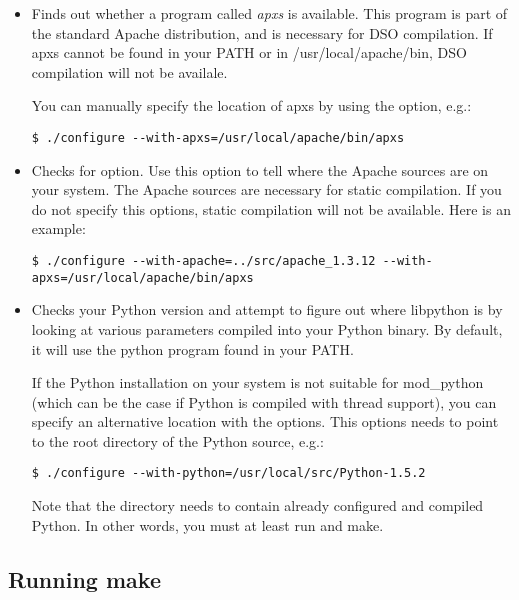 \begin{itemize}

\item
Finds out whether a program called \emph{apxs} is available. This
program is part of the standard Apache distribution, and is necessary
for DSO compilation. If apxs cannot be found in your PATH or in
/usr/local/apache/bin, DSO compilation will not be availale.

You can manually specify the location of apxs by using the
 option, e.g.:

\begin{verbatim}
$ ./configure --with-apxs=/usr/local/apache/bin/apxs 	
\end{verbatim}

\item
Checks for  option. Use this option to tell where the
Apache sources are on your system. The Apache sources are necessary
for static compilation. If you do not specify this options, static
compilation will not be available. Here is an example:

\begin{verbatim}
$ ./configure --with-apache=../src/apache_1.3.12 --with-apxs=/usr/local/apache/bin/apxs
\end{verbatim}

\item
Checks your Python version and attempt to figure out where libpython
is by looking at various parameters compiled into your Python
binary. By default, it will use the python program found in your PATH.

If the Python installation on your system is not suitable for
mod_python (which can be the case if Python is compiled with thread
support), you can specify an alternative location with the
 options. This options needs to point to the root
directory of the Python source, e.g.:

\begin{verbatim}
$ ./configure --with-python=/usr/local/src/Python-1.5.2
\end{verbatim}                      

Note that the directory needs to contain already configured and
compiled Python. In other words, you must at least run  and
make.

\end{itemize}

\subsection{Running make\label{inst-make}}

